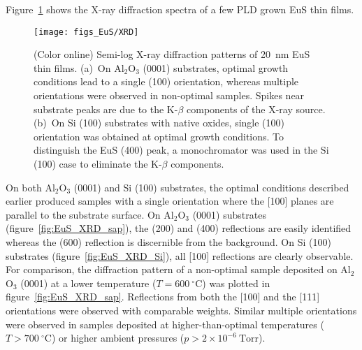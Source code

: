 Figure~\ref{fig:EuS_XRD} shows the X-ray diffraction spectra of a few PLD grown EuS thin films.%
\begin{figure}[ht]%
    \subfloat{\label{fig:EuS_XRD_sap}}%
    \subfloat{\label{fig:EuS_XRD_Si}}%
    \centering%
    \texttt{[image: figs\_EuS/XRD]}%
    \caption[X-ray diffraction spectra of EuS thin films]{\label{fig:EuS_XRD}(Color online) Semi-log X-ray diffraction patterns of 20~nm EuS thin films. (a)~On Al$_2$O$_3$ (0001) substrates, optimal growth conditions lead to a single (100) orientation, whereas multiple orientations were observed in non-optimal samples. Spikes near substrate peaks are due to the K-$\beta$ components of the X-ray source. (b)~On Si (100) substrates with native oxides, single (100) orientation was obtained at optimal growth conditions. To distinguish the EuS (400) peak, a monochromator was used in the Si (100) case to eliminate the K-$\beta$ components.}%
\end{figure} %
%
On both Al$_2$O$_3$ (0001) and Si (100) substrates, the optimal conditions described earlier produced samples with a single orientation where the [100] planes are parallel to the substrate surface. On Al$_2$O$_3$ (0001) substrates (figure~\ref{fig:EuS_XRD_sap}), the (200) and (400) reflections are easily identified whereas the (600) reflection is discernible from the background. On Si (100) substrates (figure~\ref{fig:EuS_XRD_Si}), all [100] reflections are clearly observable. For comparison, the diffraction pattern of a non-optimal sample deposited on Al$_2$O$_3$ (0001) at a lower temperature ($T=600~^{\circ}\mathrm{C}$) was plotted in figure~\ref{fig:EuS_XRD_sap}. Reflections from both the [100] and the [111] orientations were observed with comparable weights. Similar multiple orientations were observed in samples deposited at higher-than-optimal temperatures ($T>700~^{\circ}\mathrm{C}$) or higher ambient pressures ($p>2\times{}10^{-6}~\mathrm{Torr}$).

